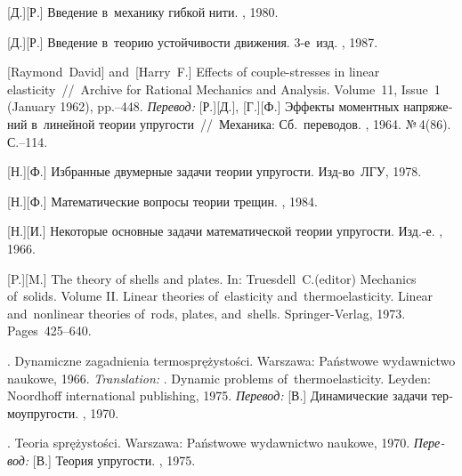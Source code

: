 \begin{thebibliography}{123}
\begin{otherlanguage}{russian}
[Д.][Р.] Введение в~механику гибкой нити. \naukapublisher, 1980. 

[Д.][Р.] Введение в~теорию устойчивости движения. 3\hbox{-}е~изд. \naukapublisher, 1987. 

[Raymond~David] %
and~[Harry~F.] %
Effects of couple-stresses in linear elasticity~//~Archive for Rational Mechanics and Analysis. Volume~11, Issue~1 (January 1962), pp.\hbox{--}448.
\emph{Перевод:}
[Р.][Д.], [Г.][Ф.]
Эффекты моментных напряжений в~линейной теории упругости~//~Механика: Сб.~переводов. \mirpublisher, 1964. №\,4\:(86). С.\hbox{--}114.

[Н.][Ф.] Избранные двумерные задачи теории упругости. Изд\hbox{-}во~ЛГУ, 1978. 

[Н.][Ф.] Математические вопросы теории трещин. \naukapublisher, 1984. 

[Н.][И.] Некоторые основные задачи математической теории упругости. Изд.\hbox{-}е. \naukapublisher, 1966. 

[P.][M.] The theory of shells and plates. In: Truesdell~C.\:(editor) Mechanics of~solids. Volume II. Linear theories of~elasticity and~thermoelasticity. Linear and~nonlinear theories of~rods, plates, and~shells. Springer\hbox{-}Verlag, 1973. Pages~425\hbox{--}640.

. Dynamiczne zagadnienia termosprężystości. Warsza\-wa: Państwowe wydawnictwo naukowe, 1966. 
\emph{Translation:}
. Dynamic problems of~thermoelasticity. Leyden: Noordhoff international publishing, 1975.
\emph{Перевод:}
[В.] Динамические задачи термоупругости. \mirpublisher, 1970. 

. Teoria sprężystości. Warszawa: Państwowe wy\-daw\-nic\-two naukowe, 1970. 
\emph{Перевод:}
[В.] Теория упругости. \mirpublisher, 1975. 


\end{otherlanguage}
\end{thebibliography}
